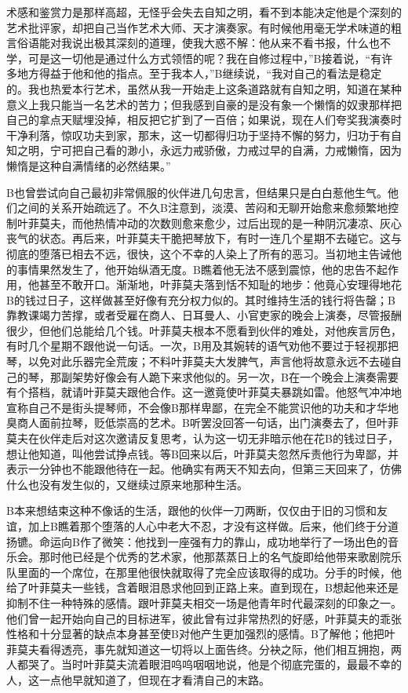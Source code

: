 \documentclass[12pt, UTF8]{ctexbook}
\begin{document}
术感和鉴赏力是那样高超，无怪乎会失去自知之明，看不到本能决定他是个深刻的艺术批评家，却把自己当作艺术大师、天才演奏家。有时候他用毫无学术味道的粗言俗语能对我说出极其深刻的道理，使我大惑不解：他从来不看书报，什么也不学，可是这一切他是通过什么方式领悟的呢？我在自修过程中，”B接着说，“有许多地方得益于他和他的指点。至于我本人，”B继续说，“我对自己的看法是稳定的。我也热爱本行艺术，虽然从我一开始走上这条道路就有自知之明，知道在某种意义上我只能当一名艺术的苦力；但我感到自豪的是没有象一个懒惰的奴隶那样把自己的拿点天赋埋没掉，相反把它扩到了一百倍；如果说，现在人们夸奖我演奏时干净利落，惊叹功夫到家，那末，这一切都得归功于坚持不懈的努力，归功于有自知之明，宁可把自己看的渺小，永远力戒骄傲，力戒过早的自满，力戒懒惰，因为懒惰是这种自满情绪的必然结果。”
\par B也曾尝试向自己最初非常佩服的伙伴进几句忠言，但结果只是白白惹他生气。他们之间的关系开始疏远了。不久B注意到，淡漠、苦闷和无聊开始愈来愈频繁地控制叶菲莫夫，而他热情冲动的次数则愈来愈少，过后出现的是一种阴沉凄凉、灰心丧气的状态。再后来，叶菲莫夫干脆把琴放下，有时一连几个星期不去碰它。这与彻底的堕落已相去不远，很快，这个不幸的人染上了所有的恶习。当初地主告诫他的事情果然发生了，他开始纵酒无度。B瞧着他无法不感到震惊，他的忠告不起作用，他甚至不敢开口。渐渐地，叶菲莫夫落到恬不知耻的地步：他竟心安理得地花B的钱过日子，这样做甚至好像有充分权力似的。其时维持生活的钱行将告罄；B靠教课竭力苦撑，或者受雇在商人、日耳曼人、小官吏家的晚会上演奏，尽管报酬很少，但他们总能给几个钱。叶菲莫夫根本不愿看到伙伴的难处，对他疾言厉色，有时几个星期不跟他说一句话。一次，B用及其婉转的语气劝他不要过于轻视那把琴，以免对此乐器完全荒废；不料叶菲莫夫大发脾气，声言他将故意永远不去碰自己的琴，那副架势好像会有人跪下来求他似的。另一次，B在一个晚会上演奏需要有个搭档，就请叶菲莫夫跟他合作。这一邀竟使叶菲莫夫暴跳如雷。他怒气冲冲地宣称自己不是街头提琴师，不会像B那样卑鄙，在完全不能赏识他的功夫和才华地臭商人面前拉琴，贬低崇高的艺术。B听罢没回答一句话，出门演奏去了，但叶菲莫夫在伙伴走后对这次邀请反复思考，认为这一切无非暗示他在花B的钱过日子，想让他知道，叫他尝试挣点钱。等B回来以后，叶菲莫夫忽然斥责他行为卑鄙，并表示一分钟也不能跟他待在一起。他确实有两天不知去向，但第三天回来了，仿佛什么也没有发生似的，又继续过原来地那种生活。
\par B本来想结束这种不像话的生活，跟他的伙伴一刀两断，仅仅由于旧的习惯和友谊，加上B瞧着那个堕落的人心中老大不忍，才没有这样做。后来，他们终于分道扬镳。命运向B作了微笑：他找到一座强有力的靠山，成功地举行了一场出色的音乐会。那时他已经是个优秀的艺术家，他那蒸蒸日上的名气旋即给他带来歌剧院乐队里面的一个席位，在那里他很快就取得了完全应该取得的成功。分手的时候，他给了叶菲莫夫一些钱，含着眼泪恳求他回到正路上来。直到现在，B想起他来还是抑制不住一种特殊的感情。跟叶菲莫夫相交一场是他青年时代最深刻的印象之一。他们曾一起开始向自己的目标进军，彼此曾有过非常热烈的好感，叶菲莫夫的乖张性格和十分显著的缺点本身甚至使B对他产生更加强烈的感情。B了解他；他把叶菲莫夫看得透亮，事先就知道这一切将以上面告终。分袂之际，他们相互拥抱，两人都哭了。当时叶菲莫夫流着眼泪呜呜咽咽地说，他是个彻底完蛋的，最最不幸的人，这一点他早就知道了，但现在才看清自己的末路。
\end{document}
